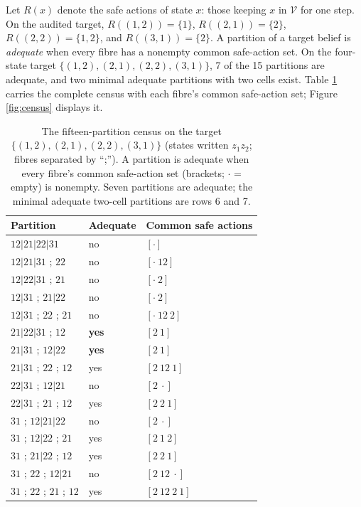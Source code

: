 \documentclass[10pt,twocolumn]{article}
\theoremstyle{definition}
\begin{document}
Let \(R(x)\) denote the safe actions of state \(x\): those keeping
\(x\) in \(\mathcal{V}\) for one step. On the audited target,
\(R((1,2)) = \{1\}\), \(R((2,1)) = \{2\}\), \(R((2,2)) = \{1,2\}\), and
\(R((3,1)) = \{2\}\). A partition of a target belief is \emph{adequate}
when every fibre has a nonempty common safe-action set. On the
four-state target \(\{(1,2), (2,1), (2,2), (3,1)\}\), 7 of the 15
partitions are adequate, and two minimal adequate partitions with two
cells exist. Table \ref{tab:census} carries the complete census with
each fibre's common safe-action set; Figure \ref{fig:census} displays
it.

\begin{table}[t]
\centering
\footnotesize
\caption{The fifteen-partition census on the target
\(\{(1,2), (2,1), (2,2), (3,1)\}\) (states written \(z_1 z_2\); fibres
separated by ``;''). A partition is adequate when every fibre's common
safe-action set (brackets; \(\cdot\) = empty) is nonempty. Seven
partitions are adequate; the minimal adequate two-cell partitions are
rows 6 and 7.}
\label{tab:census}
\begin{tabular}{@{}l l l@{}}
\toprule
Partition & Adequate & Common safe actions\\
\midrule
$12|21|22|31$ & no & $[\cdot]$\\
$12|21|31$ ; $22$ & no & $[\cdot\ 12]$\\
$12|22|31$ ; $21$ & no & $[\cdot\ 2]$\\
$12|31$ ; $21|22$ & no & $[\cdot\ 2]$\\
$12|31$ ; $22$ ; $21$ & no & $[\cdot\ 12\ 2]$\\
$21|22|31$ ; $12$ & \textbf{yes} & $[2\ 1]$\\
$21|31$ ; $12|22$ & \textbf{yes} & $[2\ 1]$\\
$21|31$ ; $22$ ; $12$ & yes & $[2\ 12\ 1]$\\
$22|31$ ; $12|21$ & no & $[2\ \cdot]$\\
$22|31$ ; $21$ ; $12$ & yes & $[2\ 2\ 1]$\\
$31$ ; $12|21|22$ & no & $[2\ \cdot]$\\
$31$ ; $12|22$ ; $21$ & yes & $[2\ 1\ 2]$\\
$31$ ; $21|22$ ; $12$ & yes & $[2\ 2\ 1]$\\
$31$ ; $22$ ; $12|21$ & no & $[2\ 12\ \cdot]$\\
$31$ ; $22$ ; $21$ ; $12$ & yes & $[2\ 12\ 2\ 1]$\\
\bottomrule
\end{tabular}
\end{table}
\end{document}
